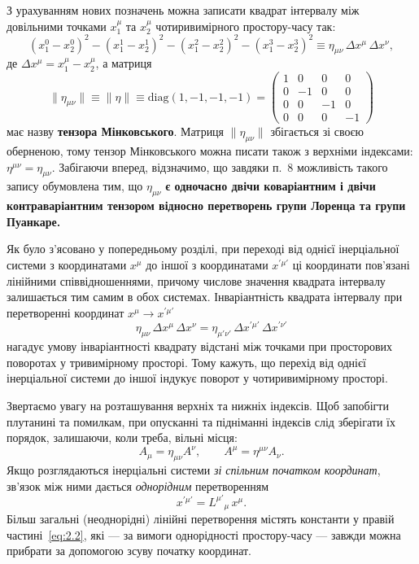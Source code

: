 З урахуванням нових позначень можна записати квадрат інтервалу між
довільними точками $x_1^\mu$ та $x_2^\mu$ чотиривимірного простору-часу так:
\[
  (x_1^0-x_2^0)^2 - (x_1^1-x_2^1)^2 - (x_1^2-x_2^2)^2 - (x_1^3-x_2^3)^2
  \equiv \eta_{\mu\nu}\,\Delta x^\mu\,\Delta x^\nu,
\]
де $\Delta x^\mu = x_1^\mu - x_2^\mu$, а матриця
\[
  \|\eta_{\mu\nu}\| \equiv \|\eta\| \equiv \mathrm{diag}(1,-1,-1,-1) =
  \begin{pmatrix}
    1 & 0 & 0 & 0\\
    0 &-1 & 0 & 0\\
    0 & 0 &-1 & 0\\
    0 & 0 & 0 &-1
  \end{pmatrix}
\]
має назву \textbf{тензора Мінковського}. Матриця $\|\eta_{\mu\nu}\|$ збігається
зі своєю оберненою, тому тензор Мінковського можна писати також з верхніми
індексами: $\eta^{\mu\nu} = \eta_{\mu\nu}$. Забігаючи вперед, відзначимо, що
завдяки п.~8 можливість такого запису обумовлена тим, що $\eta_{\mu\nu}$
\textbf{є одночасно двічи коваріантним і двічи контраваріантним тензором
відносно перетворень групи Лоренца та групи Пуанкаре.}

Як було з'ясовано у попередньому розділі, при переході від однієї
інерціальної системи з координатами $x^\mu$ до іншої з координатами
$x^{\prime\mu'}$ ці координати пов'язані лінійними співвідношеннями, причому
числове значення квадрата інтервалу залишається тим самим в обох системах.
Інваріантність квадрата інтервалу при перетворенні координат
$x^\mu \to x^{\prime\mu'}$
\begin{equation}
  \eta_{\mu\nu}\,\Delta x^\mu\,\Delta x^\nu
  = \eta_{\mu'\nu'}\,\Delta x^{\prime\mu'}\,\Delta x^{\prime\nu'}
  \label{eq:2.1}
\end{equation}
нагадує умову інваріантності квадрату відстані між точками при просторових
поворотах у тривимірному просторі. Тому кажуть, що перехід від однієї
інерціальної системи до іншої індукує поворот у чотиривимірному просторі.

Звертаємо увагу на розташування верхніх та нижніх індексів. Щоб запобігти
плутанині та помилкам, при опусканні та підніманні індексів слід зберігати
їх порядок, залишаючи, коли треба, вільні місця:
\[
  A_\mu = \eta_{\mu\nu} A^\nu, \qquad
  A^\mu = \eta^{\mu\nu} A_\nu.
\]
Якщо розглядаються інерціальні системи \textit{зі спільним початком координат},
зв'язок між ними дається \textit{однорідним} перетворенням
\begin{equation}
  x^{\prime\mu'} = L^{\mu'}{}_\mu\, x^\mu.
  \label{eq:2.2}
\end{equation}
Більш загальні (неоднорідні) лінійні перетворення містять константи у
правій частині~\eqref{eq:2.2}, які --- за вимоги однорідності простору-часу
--- завжди можна прибрати за допомогою зсуву початку координат.

